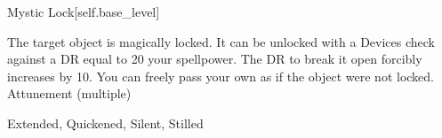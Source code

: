 \begin{spellsection}{Mystic Lock}[self.base_level]
\begin{spellcontent}
\begin{spelltargetinginfo}
\end{spelltargetinginfo}
\begin{spelleffects}
\spelleffect
The target object is magically locked.
It can be unlocked with a Devices check against a DR equal to 20 \add your spellpower.
The DR to break it open forcibly increases by 10.
You can freely pass your own  as if the object were not locked.
\spelldur Attunement (multiple)
\end{spelleffects}
\end{spellcontent}
\begin{spellfooter}
 Extended, Quickened, Silent, Stilled
\end{spellfooter}
\begin{spellsubcontent}
\end{spellsubcontent}
\end{spellsection}
